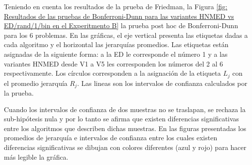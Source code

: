 Teniendo en cuenta los resultados de la prueba de Friedman, la Figura \ref{fig: Resultados de las pruebas de Bonferroni-Dunn para las variantes HNMED vs ED/rand/1/bin en el Experitmento B} la prueba post hoc de Bonferroni-Dunn para los 6 problemas. En las gráficas, el eje vertical presenta las etiquetas dadas a cada algoritmo y el horizontal las jerarquías promedios. Las etiquetas están asignadas de la siguiente forma: a la ED le corresponde el número 1 y a las variantes HNMED desde V1 a V5 les corresponden los números del 2 al 6 respectivamente. Los círculos corresponden a la asignación de la etiqueta $L_j$ con el promedio jerarquía  $R_j$. Las lineas son los intervalos de confianza calculados por la prueba. 

Cuando los intervalos de confianza de dos muestras no se traslapan, se rechaza la sub-hipótesis nula y por lo tanto se afirma que existen diferencias significativas entre los algoritmos que describen dichas muestras. En las figuras presentadas los promedios de jerarquía e intervalos de confianza entre los cuales existen diferencias significativas se dibujan con colores diferentes (azul y rojo) para hacer más legible la gráfica.     

